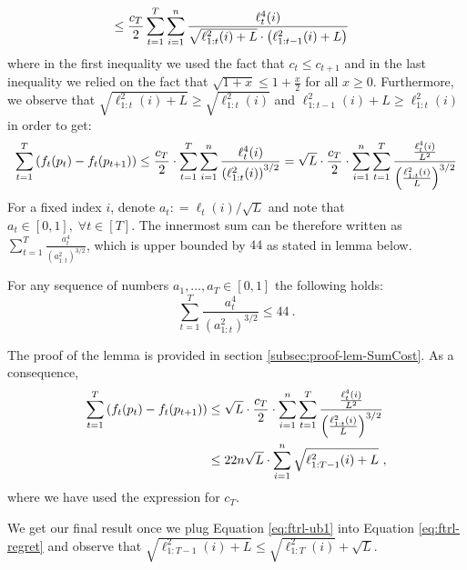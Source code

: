 \begin{proofarg}{}
\begin{align*}
&\leq 
\frac{c_T}{2}\sum_{t=1}^T \sum_{i=1}^n  \frac{  \ell_t^4(i)}{\sqrt{\ell_{1:t}^2(i)+L} \cdot \left( \ell^2_{1:t-1}(i) +L \right)}
\end{align*}
where in the first inequality we used the fact that $c_t \leq c_{t+1}$ and in the last inequality we relied on the fact that $\sqrt{1+x} \leq 1+\frac{x}{2}$ for all $x \geq 0$. Furthermore, we observe that $\sqrt{\ell_{1:t}^2(i)+L}  \geq \sqrt{\ell_{1:t}^2(i)} $ and $\ell^2_{1:t-1}(i) +L \geq \ell^2_{1:t}(i)$ in order to get:
\begin{equation*}
\sum_{t=1}^T \left(   f_t(p_t) -  f_t(p_{t+1})  \right) \leq \frac{c_T}{2} \cdot \sum_{t=1}^T \sum_{i=1}^n  \frac{\ell_t^4(i)}{\left(\ell_{1:t}^2(i)\right)^{3/2}} =  \sqrt{L} \cdot \frac{c_T}{2}  \cdot \sum_{i=1}^n \sum_{t=1}^T\frac{ \frac{\ell_t^4(i)}{L^2}  }{\left( \frac{\ell_{1:t}^2(i)}{L}  \right)^{3/2}} 
\end{equation*}
For a fixed index $i$,  denote $a_t: = \ell_t(i) / \sqrt{L}$  and note that $a_t\in [0, 1],\; \forall t \in [T]$. The innermost sum can be therefore written as $\sum_{t=1}^T \frac{a_t^4}{(a^2_{1:t})^{3/2}}$, which is upper bounded by $44$ as stated in lemma below.
\begin{lemma}\label{lem:SumConst}
For any sequence of  numbers $a_1,\ldots, a_T \in[0,1]$ the following holds:
\begin{equation*}
\sum_{t=1}^T \frac{a_t^4}{(a^2_{1:t})^{3/2}} \leq 44~.
\end{equation*}
\end{lemma}
The proof of the lemma is provided in section \ref{subsec:proof-lem-SumCost}. As a consequence,
\begin{align}\label{eq:ftrl-ub1}
\sum_{t=1}^T \left(   f_t(p_t) -  f_t(p_{t+1})  \right)
&\leq
  \sqrt{L} \cdot \frac{c_T}{2} \cdot  \sum_{i=1}^n \sum_{t=1}^T\frac{ \frac{\ell_t^4(i)}{L^2}  }{\left( \frac{\ell_{1:t}^2(i)}{L}  \right)^{3/2}} 
  \nonumber\\
  &\leq 
  22 n \sqrt{L} \cdot \sum_{i=1}^n  \sqrt{\ell_{1:T-1}^2(i)+L}~,
\end{align}
where we have used the expression for $c_T$.

We get our final result once we plug Equation \eqref{eq:ftrl-ub1} into Equation \eqref{eq:ftrl-regret} and observe that \linebreak $\sqrt{\ell_{1:T-1}^2(i)+L} \leq  \sqrt{\ell_{1:T}^2(i)}+\sqrt{L}$.
\end{proofarg}

